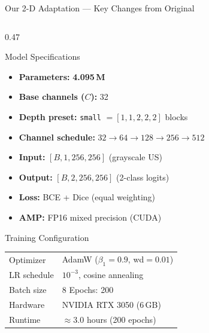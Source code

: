 \documentclass[aspectratio=169,10pt]{beamer}
\begin{document}
\begin{frame}{Our 2-D Adaptation --- Key Changes from Original}
\begin{columns}[T]
    \begin{column}{0.47\textwidth}
      \begin{block}{Model Specifications}
        \begin{itemize}
          \item \textbf{Parameters:} \textbf{4.095\,M}
          \item \textbf{Base channels ($C$):} 32
          \item \textbf{Depth preset:} \texttt{small} $= [1,1,2,2,2]$ blocks
          \item \textbf{Channel schedule:} $32 \to 64 \to 128 \to 256 \to 512$
          \item \textbf{Input:} $[B,1,256,256]$ (grayscale US)
          \item \textbf{Output:} $[B,2,256,256]$ (2-class logits)
          \item \textbf{Loss:} BCE + Dice (equal weighting)
          \item \textbf{AMP:} FP16 mixed precision (CUDA)
        \end{itemize}
      \end{block}
      \vspace{4pt}
      \begin{exampleblock}{Training Configuration}
        \begin{tabular}{ll}
          Optimizer    & AdamW ($\beta_1{=}0.9$, wd$=0.01$)\\
          LR schedule  & $10^{-3}$, cosine annealing\\
          Batch size   & 8 \quad Epochs: 200\\
          Hardware     & NVIDIA RTX 3050 (6\,GB)\\
          Runtime      & $\approx 3.0$ hours (200 epochs)\\
        \end{tabular}
      \end{exampleblock}
    \end{column}
  \end{columns}
\end{frame}
\end{document}
